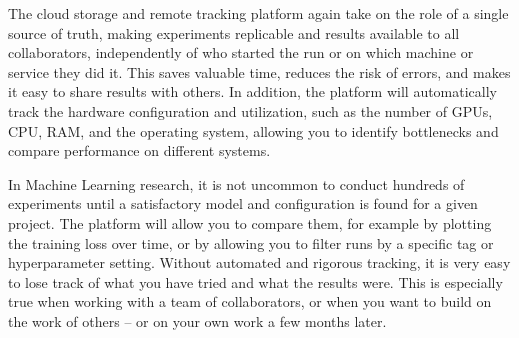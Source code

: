 The cloud storage and remote tracking platform again take on the role of a single source of truth, making experiments replicable and results available to all collaborators, independently of who started the run or on which machine or service they did it.
This saves valuable time, reduces the risk of errors, and makes it easy to share results with others.
In addition, the platform will automatically track the hardware configuration and utilization, such as the number of GPUs, CPU, RAM, and the operating system, allowing you to identify bottlenecks and compare performance on different systems.

In Machine Learning research, it is not uncommon to conduct hundreds of experiments until a satisfactory model and configuration is found for a given project.
The platform will allow you to compare them, for example by plotting the training loss over time, or by allowing you to filter runs by a specific tag or hyperparameter setting.
Without automated and rigorous tracking, it is very easy to lose track of what you have tried and what the results were.
This is especially true when working with a team of collaborators, or when you want to build on the work of others -- or on your own work a few months later.
